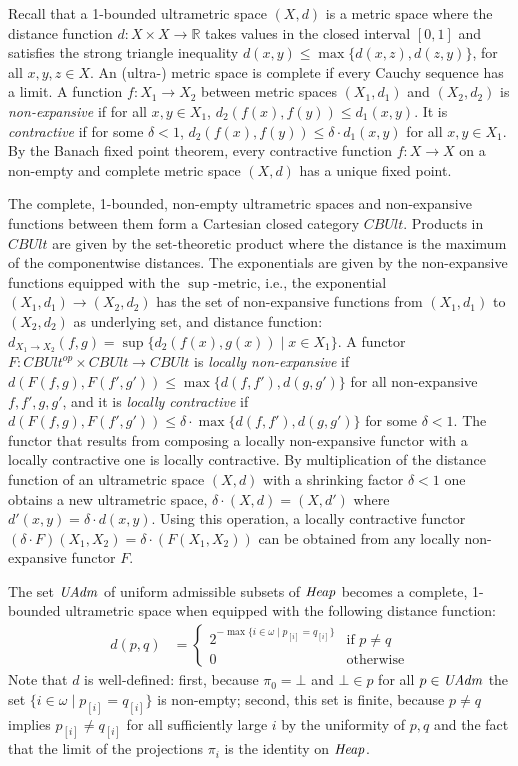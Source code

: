 \documentclass{LMCS}
\theoremstyle{remark}
\newcommand{\CBUlt}{\mathit{CBUlt}\xspace}
\newcommand{\RANK}[2]{\ensuremath{{#1}_{[#2]}}}
\newcommand{\RR}{\ensuremath{\mathbb R}}
\begin{document}
Recall that a 1-bounded ultrametric space $(X,d)$ is  a 
metric space where the distance function  $d:X\times X\to\RR$ takes values in the closed interval $[0,1]$ and satisfies the strong triangle inequality $d(x,y)\leq \max\{d(x,z),d(z,y)\}$, for all $x,y,z\in X$. 
An (ultra-) metric space is complete if every Cauchy sequence has a limit. 
A function $f:X_1\to X_2$ between metric spaces $(X_1,d_1)$ and $(X_2,d_2)$ is \emph{non-expansive} if for all $x,y\in X_1$, $d_{2}(f(x),f(y))\leq d_1(x,y)$. It is \emph{contractive} if for some $\delta<1$, $d_{2}(f(x),f(y))\leq \delta\cdot d_1(x,y)$ for all $x,y\in X_1$. 
By the Banach fixed point theorem, every contractive function $f:X\to X$ on a non-empty and complete metric space $(X,d)$ has a unique fixed point.


The complete, 1-bounded, non-empty ultrametric spaces and non-expansive functions between them form a Cartesian closed category $\CBUlt$. Products in $\CBUlt$ are given by the set-theoretic product where the distance is the maximum of the componentwise distances. The exponentials are given by the non-expansive functions equipped with the $\sup$-metric, i.e.,  
the exponential $(X_1, d_1) \to (X_2, d_2)$ has the set of
non-expansive functions from $(X_1, d_1)$ to $(X_2, d_2)$ as
underlying set, and 
distance function:
$d_{X_1 \to X_2}(f,g) = \sup\{d_2(f(x),g(x)) \mid x \in X_1 \}$. 
A functor $F:\CBUlt^\textit{op}\times\CBUlt\longrightarrow\CBUlt$ is \emph{locally non-expansive} 
if $d(F(f,g),F(f',g'))\leq \max\{d(f,f'),d(g,g')\}$ for all non-expansive $f,f',g,g'$, 
and it is \emph{locally contractive} 
if $d(F(f,g),F(f',g'))\leq \delta\cdot \max\{d(f,f'),d(g,g')\}$ for some $\delta<1$.
 The functor that results from composing a locally non-expansive functor with a locally contractive one is locally contractive. 
By multiplication of the distance function of an ultrametric space $(X,d)$ with a shrinking factor $\delta <1$ one obtains a new ultrametric space, $\delta\cdot (X,d) = (X,d')$ where $d'(x,y) = \delta\cdot d(x,y)$. Using this operation, a locally contractive functor $(\delta\cdot F)(X_1,X_2) = \delta\cdot (F(X_1,X_2))$ can be obtained from any locally non-expansive functor $F$.

The set $\mathit{UAdm}$ of uniform admissible subsets of $\mathit{Heap}$ becomes a complete, 1-bounded ultrametric space when equipped with the following distance function:
\begin{align*}
d(p,q) &= 
\begin{cases}
2^{-\max\{i\in\omega\;|\;\RANK{p}i = \RANK{q}i\}} &\text{if $p\neq q$}\\
0 &\text{otherwise} 
\end{cases}
\end{align*}
Note that $d$ is well-defined: first, because $\pi_0 = \bot$ and $\bot\in p$ for all $p\in\mathit{UAdm}$ the set $\{i\in\omega\;|\;\RANK{p}i = \RANK{q}i\}$ is non-empty; second,  this set is finite, because $p\neq q$ implies $\RANK{p}i \neq \RANK{q}i$ for all sufficiently large $i$ by the uniformity of $p,q$ and the fact that the limit of the projections $\pi_i$ is the identity on $\mathit{Heap}$.
\end{document}

